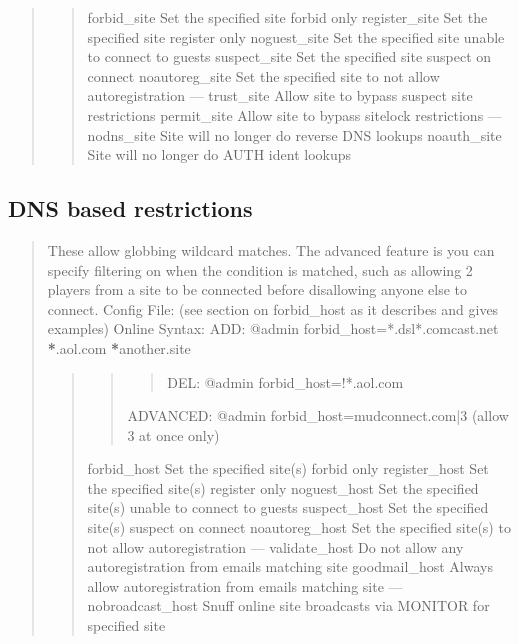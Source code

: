 \documentclass[letterpaper,10pt,english]{sphinxmanual}
\begin{document}
\begin{quote}
\begin{quote}
\begin{quote}
\begin{description}
\begin{description}
\end{description}

\end{description}
\end{quote}

\sphinxAtStartPar
forbid\_site      \sphinxhyphen{} Set the specified site forbid only
register\_site    \sphinxhyphen{} Set the specified site register only
noguest\_site     \sphinxhyphen{} Set the specified site unable to connect to guests
suspect\_site     \sphinxhyphen{} Set the specified site suspect on connect
noautoreg\_site   \sphinxhyphen{} Set the specified site to not allow autoregistration
—
trust\_site       \sphinxhyphen{} Allow site to bypass suspect site restrictions
permit\_site      \sphinxhyphen{} Allow site to bypass sitelock restrictions
—
nodns\_site       \sphinxhyphen{} Site will no longer do reverse DNS lookups
noauth\_site      \sphinxhyphen{} Site will no longer do AUTH ident lookups
\end{quote}
\end{quote}


\subsection{DNS based restrictions}
\label{\detokenize{08-lockdown:dns-based-restrictions}}\begin{quote}

\sphinxAtStartPar
These allow globbing wildcard matches.
The advanced feature is you can specify filtering on
when the condition is matched, such as allowing 2 players from a site to
be connected before disallowing anyone else to connect.
Config File: (see section on forbid\_host as it describes and gives examples)
Online Syntax: ADD: @admin forbid\_host=*.dsl*.comcast.net {\color{red}\bfseries{}*}.aol.com {\color{red}\bfseries{}*}another.site
\begin{quote}
\begin{quote}
\begin{quote}

\sphinxAtStartPar
DEL: @admin forbid\_host=!*.aol.com
\end{quote}

\sphinxAtStartPar
ADVANCED: @admin forbid\_host=mudconnect.com|3 (allow 3 at once only)
\end{quote}

\sphinxAtStartPar
forbid\_host     \sphinxhyphen{} Set the specified site(s) forbid only
register\_host   \sphinxhyphen{} Set the specified site(s) register only
noguest\_host    \sphinxhyphen{} Set the specified site(s) unable to connect to guests
suspect\_host    \sphinxhyphen{} Set the specified site(s) suspect on connect
noautoreg\_host  \sphinxhyphen{} Set the specified site(s) to not allow autoregistration
—
validate\_host   \sphinxhyphen{} Do not allow any autoregistration from emails matching site
goodmail\_host   \sphinxhyphen{} Always allow autoregistration from emails matching site
—
nobroadcast\_host \sphinxhyphen{} Snuff online site broadcasts via MONITOR for specified site
\end{quote}
\end{quote}
\end{document}
